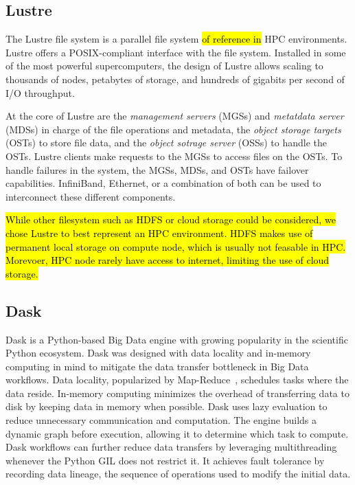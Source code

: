 \documentclass[AMA,STIX1COL]{WileyNJD-v2}
\newcommand{\HL}[1]{\hl{#1}}
\begin{document}
\subsection{Lustre}
The Lustre file system is a parallel file system \HL{of reference in} HPC environments.
Lustre offers a POSIX-compliant interface with the file system.
Installed in some of the most powerful supercomputers, the design of Lustre allows
scaling to thousands of nodes, petabytes of storage, and hundreds of gigabits per second of I/O throughput.
		
At the core of Lustre are the \textit{management servers} (MGSs) and \textit{metatdata server} (MDSs) in charge of the file operations and metadata,
the \textit{object storage targets} (OSTs) to store file data, and the \textit{object sotrage server} (OSSs) to handle the OSTs.
Lustre clients make requests to the MGSs to access files on the OSTs.
To handle failures in the system, the MGSs, MDSs, and OSTs have failover capabilities.
InfiniBand, Ethernet, or a combination of both can be used to interconnect these different components.
		
\HL{While other filesystem such as HDFS or cloud storage could be considered, we chose Lustre to best represent an HPC environment.
	HDFS makes use of permanent local storage on compute node, which is usually not feasable in HPC.
Morevoer, HPC node rarely have access to internet, limiting the use of cloud storage.}
		
\subsection{Dask}
Dask is a Python-based Big Data engine with growing popularity in the scientific Python ecosystem.
Dask was designed with data locality and in-memory computing in mind to mitigate the data transfer bottleneck in Big Data workflows.
Data locality, popularized by Map-Reduce~\cite{dean2008mapreduce}, schedules tasks where the data reside.
In-memory computing minimizes the overhead of transferring data to disk by keeping data in memory when possible.
Dask uses lazy evaluation to reduce unnecessary communication and computation.
The engine builds a dynamic graph before execution, allowing it to determine which task to compute.
Dask workflows can further reduce data transfers by leveraging multithreading whenever the Python GIL does not restrict it.
It achieves fault tolerance by recording data lineage, the sequence of operations used to modify the initial data.
		
\end{document}
